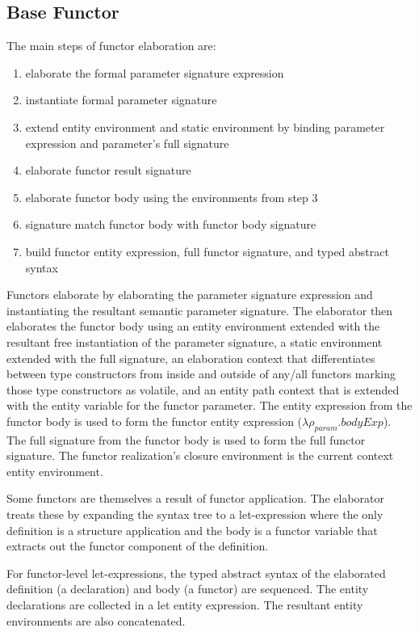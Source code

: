 \subsection{Base Functor}
The main steps of functor elaboration are:
\begin{enumerate}
	\item elaborate the formal parameter signature expression 
	\item instantiate formal parameter signature 
	\item extend entity environment and static environment by binding parameter expression and parameter's full signature
	\item elaborate functor result signature
	\item elaborate functor body using the environments from step 3
	\item signature match functor body with functor body signature
	\item build functor entity expression, full functor signature, and typed abstract syntax
\end{enumerate}
          
Functors elaborate by elaborating the parameter signature expression and instantiating the resultant semantic parameter signature. The elaborator then elaborates the functor body using an entity environment extended with the resultant free instantiation of the parameter signature, a static environment extended with the full signature, an elaboration context that differentiates between type constructors from inside and outside of any/all functors marking those type constructors as volatile, and an entity path context that is extended with the entity variable for the functor parameter. The entity expression from the functor body is used to form the functor entity expression ($\lambda\rho_{param}.bodyExp$). The full signature from the functor body is used to form the full functor signature. The functor realization's closure environment is the current context entity environment.

Some functors are themselves a result of functor application. The elaborator treats these by expanding the syntax tree to a let-expression where the only definition is a structure application and the body is a functor variable that extracts out the functor component of the definition. 
 
For functor-level let-expressions, the typed abstract syntax of the elaborated definition (a declaration) and body (a functor) are sequenced. The entity declarations are collected in a let entity expression. The resultant entity environments are also concatenated. 

